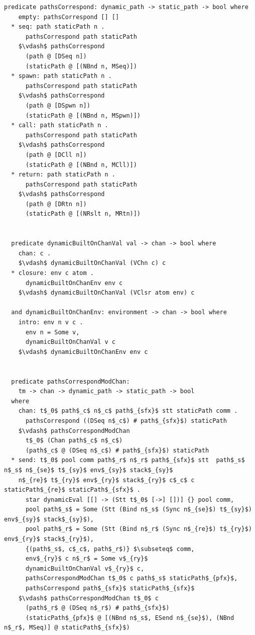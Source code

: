 \documentclass[letterpaper, 11pt]{extarticle}
\begin{document}
\begin{lstlisting}[language=logic, mathescape]
  predicate pathsCorrespond: dynamic_path -> static_path -> bool where
    empty: pathsCorrespond [] []
  * seq: path staticPath n .
      pathsCorrespond path staticPath
    $\vdash$ pathsCorrespond
      (path @ [DSeq n])
      (staticPath @ [(NBnd n, MSeq)])
  * spawn: path staticPath n .
      pathsCorrespond path staticPath
    $\vdash$ pathsCorrespond
      (path @ [DSpwn n])
      (staticPath @ [(NBnd n, MSpwn)])
  * call: path staticPath n .
      pathsCorrespond path staticPath
    $\vdash$ pathsCorrespond
      (path @ [DCll n])
      (staticPath @ [(NBnd n, MCll)])
  * return: path staticPath n .
      pathsCorrespond path staticPath
    $\vdash$ pathsCorrespond
      (path @ [DRtn n])
      (staticPath @ [(NRslt n, MRtn)])


  predicate dynamicBuiltOnChanVal val -> chan -> bool where
    chan: c .
    $\vdash$ dynamicBuiltOnChanVal (VChn c) c
  * closure: env c atom .
      dynamicBuiltOnChanEnv env c
    $\vdash$ dynamicBuiltOnChanVal (VClsr atom env) c

  and dynamicBuiltOnChanEnv: environment -> chan -> bool where
    intro: env n v c . 
      env n = Some v,
      dynamicBuiltOnChanVal v c
    $\vdash$ dynamicBuiltOnChanEnv env c


  predicate pathsCorrespondModChan:
    tm -> chan -> dynamic_path -> static_path -> bool
  where
    chan: t$_0$ path$_c$ n$_c$ path$_{sfx}$ stt staticPath comm .
      pathsCorrespond ((DSeq n$_c$) # path$_{sfx}$) staticPath
    $\vdash$ pathsCorrespondModChan
      t$_0$ (Chan path$_c$ n$_c$)
      (path$_c$ @ (DSeq n$_c$) # path$_{sfx}$) staticPath
  * send: t$_0$ pool comm path$_r$ n$_r$ path$_{sfx}$ stt  path$_s$ n$_s$ n$_{se}$ t$_{sy}$ env$_{sy}$ stack$_{sy}$
    n$_{re}$ t$_{ry}$ env$_{ry}$ stack$_{ry}$ c$_c$ c staticPath$_{re}$ staticPath$_{sfx}$ . 
      star dynamicEval [[] -> (Stt t$_0$ [->] [])] {} pool comm,
      pool path$_s$ = Some (Stt (Bind n$_s$ (Sync n$_{se}$) t$_{sy}$) env$_{sy}$ stack$_{sy}$),
      pool path$_r$ = Some (Stt (Bind n$_r$ (Sync n$_{re}$) t$_{ry}$) env$_{ry}$ stack$_{ry}$),
      {(path$_s$, c$_c$, path$_r$)} $\subseteq$ comm, 
      env$_{ry}$ c n$_r$ = Some v$_{ry}$
      dynamicBuiltOnChanVal v$_{ry}$ c, 
      pathsCorrespondModChan t$_0$ c path$_s$ staticPath$_{pfx}$,
      pathsCorrespond path$_{sfx}$ staticPath$_{sfx}$
    $\vdash$ pathsCorrespondModChan t$_0$ c
      (path$_r$ @ (DSeq n$_r$) # path$_{sfx}$)
      (staticPath$_{pfx}$ @ [(NBnd n$_s$, ESend n$_{se}$), (NBnd n$_r$, MSeq)] @ staticPath$_{sfx}$)
\end{lstlisting}
\end{document}
